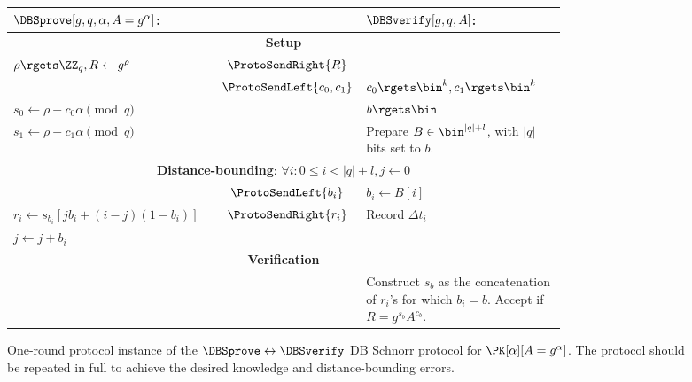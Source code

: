 \begin{figure*}
  \centering
  \small
  \setlength{\ProtoArrowLength}{0.07\linewidth}
  \begin{tabular}{p{0.40\linewidth}cp{0.40\linewidth}}
    \(\DBSprove[g, q, \alpha, A = g^\alpha]\):
    & &
    \(\DBSverify[g, q, A]\):
    \\
    \midrule

    \multicolumn{3}{c}{\textbf{Setup}} \\

    \(\rho\rgets \ZZ_q, R\gets g^{\rho}\)
    & \(\ProtoSendRight{R}\)
    &
    \\

    & \(\ProtoSendLeft{c_0, c_1}\)
    & \(c_0\rgets \bin^k, c_1\rgets \bin^k\)
    \\

    \(s_0\gets \rho - c_0\alpha \pmod q\)
    &
    & \(b\rgets \bin\)
    \\

    \(s_1\gets \rho - c_1\alpha \pmod q\)
    &
    & Prepare \(B\in \bin^{|q|+l}\), with \(|q|\) bits set to \(b\).
    \\

    \midrule
    \multicolumn{3}{c}{\textbf{Distance-bounding}: \(\forall i: 0\leq i < |q| + 
        l, j\gets 0\)} \\


    & \(\ProtoSendLeft{b_i}\)
    & \(b_i\gets B[i]\)
    \\

    \(r_i\gets s_{b_i}[jb_i + (i-j)(1-b_i)]\)
    & \(\ProtoSendRight{r_i}\)
    & Record \(\Delta t_i\)
    \\

    \(j \gets j + b_i\)
    &
    &
    \\

    \midrule
    \multicolumn{3}{c}{\textbf{Verification}}
    \\

    &
    & Construct \(s_b\) as the concatenation of \(r_i\)'s for which \(b_i = 
      b\).
      Accept if \(R = g^{s_b} A^{c_b}\).
    \\
    
  \end{tabular}
  \caption{%
    One-round protocol instance of the \(\DBSprove\leftrightarrow \DBSverify\) \ac{DB} Schnorr protocol for \(\PK[\alpha][A = g^\alpha]\).
    The protocol should be repeated in full to achieve the desired knowledge and distance-bounding errors.
  }%
  \label{SchnorrFigure}
\end{figure*}


